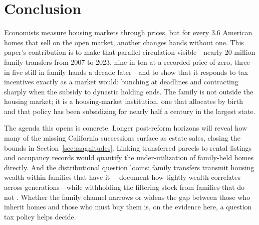 \documentclass[12pt, letterpaper]{article}
\begin{document}
\section{Conclusion}\label{sec:conclusion}

Economists measure housing markets through prices, but for every 3.6 American
homes that sell on the open market, another changes hands without one. This
paper's contribution is to make that parallel circulation visible---nearly 20
million family transfers from 2007 to 2023, nine in ten at a recorded price
of zero, three in five still in family hands a decade later---and to show
that it responds to tax incentives exactly as a market would: bunching at
deadlines and contracting sharply when the subsidy to dynastic holding ends. The family is not outside the housing market; it is a
housing-market institution, one that allocates by birth and that policy has
been subsidizing for nearly half a century in the largest state.

The agenda this opens is concrete. Longer post-reform horizons will reveal
how many of the missing California successions surface as estate sales,
closing the bounds in Section~\ref{sec:magnitudes}. Linking transferred
parcels to rental listings and occupancy records would quantify the
under-utilization of family-held homes directly. And the distributional
question looms: family transfers transmit housing wealth within families
that have it---\citet{charleshurst2003wealth} document how tightly wealth
correlates across generations---while withholding the filtering stock from
families that do not \citep{rosenthal2014filtering}. Whether the family
channel narrows or widens the gap between those who inherit homes and those
who must buy them is, on the evidence here, a question tax policy helps
decide.



\appendix

\end{document}
